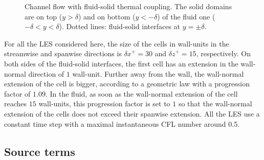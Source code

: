 \documentclass{svjour3}                     %
\begin{document}
\begin{figure}
\centering
\caption{
Channel flow with fluid-solid thermal coupling.
The solid domains are on top (${y>\delta}$) and on bottom (${y<-\delta}$) of the fluid one (${-\delta<y<\delta}$).
Dotted lines: fluid-solid interfaces at ${y = \pm \delta}$.
}\label{fig-sketch}
\end{figure}

For all the LES considered here, the size of the cells in wall-units in the streamwise and spanwise directions is ${\delta x}^+ = 30$ and ${\delta z}^+=15$, respectively.
On both sides of the fluid-solid interfaces, the first cell has an extension in the wall-normal direction of $1$ wall-unit.
Further away from the wall, the wall-normal extension of the cell is bigger, according to a geometric law with a progression factor of $1.09$.
In the fluid, as soon as the wall-normal extension of the cell reaches $15$ wall-units, this progression factor is set to $1$ so that the wall-normal extension of the cells does not exceed their spanwise extension.
All the LES use a constant time step with a maximal instantaneous CFL number around 0.5.

\subsection{Source terms}
\label{subsec-sce_trm}
\end{document}
